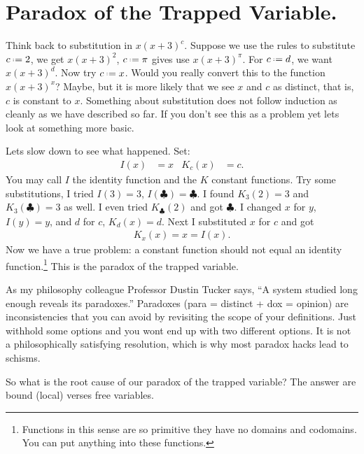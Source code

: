 
\section{Paradox of the Trapped Variable.}
Think back to substitution in $x(x+3)^c$.  Suppose we use 
the rules to substitute $c\defeq 2$, we get $x(x+3)^2$, $c\defeq \pi$ gives 
use $x(x+3)^{\pi}$.  For $c\defeq d$, we want $x(x+3)^d$.  
Now try $c\defeq x$.  Would you really 
convert this to the function $x(x+3)^x$?  Maybe, but it is more likely that 
we see $x$ and $c$ as distinct, that is, $c$ is constant to $x$.
Something about substitution does not follow induction as cleanly as we have described so far.
If you don't see this as a problem yet lets look at something more basic.

Lets slow down to see what happened.  Set:
\begin{align*}
    I(x) & = x & 
    K_c(x) & = c.
\end{align*}
You may call $I$ the identity function and the $K$ constant functions.
Try some substitutions, I tried $I(3)=3$, $I(\clubsuit)=\clubsuit$.
I found $K_3(2)=3$ and $K_3(\clubsuit)=3$ as well.  I even tried 
$K_{\clubsuit}(2)$ and got $\clubsuit$.  I changed $x$ for $y$, 
$I(y)=y$, and $d$ for $c$, $K_d(x)=d$. Next I substituted $x$ for $c$ and got
\begin{align*}
    K_x(x)=x=I(x).
\end{align*}
Now we have a true problem: a constant function should not equal 
an identity function.\footnote{Functions in this sense are so primitive 
they have no domains and codomains.  You can put anything into these functions.}
This is the paradox of the trapped variable.

As my philosophy  colleague Professor Dustin Tucker says, 
``A system studied long enough reveals its paradoxes.'' 
Paradoxes (para = distinct + dox = opinion) are inconsistencies that you can avoid by revisiting the scope 
of your definitions.  Just withhold some options and you wont end up with 
two different options.  It is not a philosophically satisfying resolution,
which is why most paradox hacks lead to schisms. 

So what is the root cause of our paradox of the trapped variable?
The answer are bound (local) verses free variables. 

